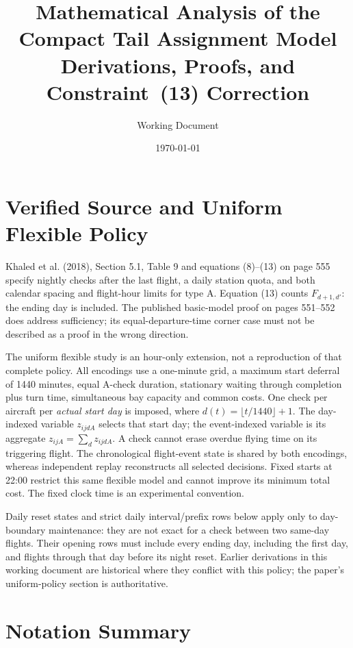 \documentclass[11pt, a4paper]{article}
\title{Mathematical Analysis of the Compact Tail Assignment Model\\
  \large Derivations, Proofs, and Constraint~(13) Correction}
\author{Working Document}
\date{\today}
\theoremstyle{plain}
\theoremstyle{definition}
\theoremstyle{remark}
\begin{document}
\maketitle
\tableofcontents
\clearpage

\section{Verified Source and Uniform Flexible Policy}
Khaled et al. (2018), Section 5.1, Table 9 and equations (8)--(13) on
page 555 specify nightly checks after the last flight, a daily station quota,
and both calendar spacing and flight-hour limits for type A. Equation (13)
counts $F_{d+1,d'}$: the ending day is included. The published basic-model
proof on pages 551--552 does address sufficiency; its equal-departure-time
corner case must not be described as a proof in the wrong direction.

The uniform flexible study is an hour-only extension, not a reproduction of
that complete policy. All encodings use a one-minute grid, a maximum
start deferral of 1440 minutes, equal A-check duration, stationary waiting
through completion plus turn time, simultaneous bay capacity and common
costs. One check per aircraft per \emph{actual start day} is imposed, where
$d(t)=\lfloor t/1440\rfloor+1$. The day-indexed variable $z_{ijdA}$
selects that start day; the event-indexed variable is its aggregate
$z_{ijA}=\sum_d z_{ijdA}$. A check cannot erase overdue flying time on its
triggering flight. The chronological flight-event state is shared by both
encodings, whereas independent replay reconstructs all selected decisions.
Fixed starts at 22:00 restrict this same flexible model and cannot improve
its minimum total cost. The fixed clock time is an experimental convention.

Daily reset states and strict daily interval/prefix rows below apply only
to day-boundary maintenance: they are not exact for a check between two
same-day flights. Their opening rows must include every ending day,
including the first day, and flights through that day before its night reset.
Earlier derivations in this working document are historical where they
conflict with this policy; the paper's uniform-policy section is authoritative.

\section{Notation Summary}
\end{document}
